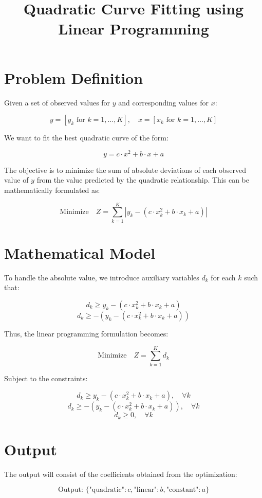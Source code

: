 \documentclass{article}
\begin{document}
\title{Quadratic Curve Fitting using Linear Programming}
\author{}
\date{}
\maketitle

\section*{Problem Definition}

Given a set of observed values for \( y \) and corresponding values for \( x \):

\[
y = [y_{k} \text{ for } k = 1,\ldots,K], \quad x = [x_{k} \text{ for } k = 1,\ldots,K]
\]

We want to fit the best quadratic curve of the form:

\[
y = c \cdot x^2 + b \cdot x + a
\]

The objective is to minimize the sum of absolute deviations of each observed value of \( y \) from the value predicted by the quadratic relationship. This can be mathematically formulated as:

\[
\text{Minimize} \quad Z = \sum_{k=1}^{K} |y_{k} - (c \cdot x_{k}^2 + b \cdot x_{k} + a)|
\]

\section*{Mathematical Model}

To handle the absolute value, we introduce auxiliary variables \( d_{k} \) for each \( k \) such that:

\[
d_{k} \geq y_{k} - (c \cdot x_{k}^2 + b \cdot x_{k} + a)
\]
\[
d_{k} \geq -(y_{k} - (c \cdot x_{k}^2 + b \cdot x_{k} + a))
\]

Thus, the linear programming formulation becomes:

\[
\text{Minimize} \quad Z = \sum_{k=1}^{K} d_{k}
\]

Subject to the constraints:

\[
d_{k} \geq y_{k} - (c \cdot x_{k}^2 + b \cdot x_{k} + a), \quad \forall k
\]
\[
d_{k} \geq -(y_{k} - (c \cdot x_{k}^2 + b \cdot x_{k} + a)), \quad \forall k
\]
\[
d_{k} \geq 0, \quad \forall k
\]

\section*{Output}

The output will consist of the coefficients obtained from the optimization:

\[
\text{Output: } \{ 
\text{"quadratic"} : c, 
\text{"linear"} : b, 
\text{"constant"} : a 
\}
\]
\end{document}

